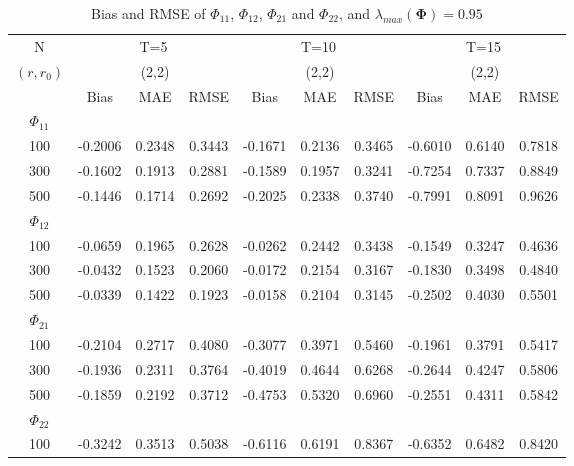 \documentclass[12pt,a4paper,hyperref]{article}
\begin{document}
\begin{table}[H]
\caption{Bias and RMSE of $\Phi_{11}$, $\Phi_{12}$, $\Phi_{21}$ and $\Phi_{22}$, and $\lambda_{max}(\boldsymbol{\Phi})=0.95$}     \label{table1}
\centering
\tabcolsep=0.11cm
\begin{threeparttable}
\begin{tabular} {*{10}{c}}
\toprule
N& \multicolumn{3}{c}{T=5}&\multicolumn{3}{c}{T=10}&\multicolumn{3}{c}{T=15}\\
\cmidrule(lr){1-10}
$(r,r_{0})$ &   &(2,2)  &  &   &(2,2)  & &  &(2,2) & \\
\cmidrule(lr){1-4} \cmidrule(lr){5-7}\cmidrule(lr){8-10}
& \multicolumn{1}{c}{Bias} &\multicolumn{1}{c}{MAE}& \multicolumn{1}{c}{RMSE}&\multicolumn{1}{c}{Bias} &\multicolumn{1}{c}{MAE}& \multicolumn{1}{c}{RMSE}&\multicolumn{1}{c}{Bias}&\multicolumn{1}{c}{MAE} & \multicolumn{1}{c}{RMSE}\\
  \cmidrule(lr){2-4} \cmidrule(lr){5-7} \cmidrule(lr){8-10}
 $\Phi_{11}$\\
\cmidrule(lr){1-10}
 100&-0.2006 & 0.2348& 0.3443&	-0.1671 &	0.2136& 0.3465&-0.6010 &0.6140 & 0.7818 \\
300& -0.1602 &0.1913 &0.2881&	-0.1589 &0.1957	&0.3241	&-0.7254& 0.7337& 0.8849 \\
500& -0.1446&0.1714 & 0.2692&	 -0.2025 &0.2338& 0.3740& -0.7991& 0.8091&	0.9626  \\
\cmidrule(lr){1-10}
$\Phi_{12}$\\
\cmidrule(lr){1-4}   \cmidrule(lr){5-7}   \cmidrule(lr){8-10}
  100&-0.0659  &0.1965 & 0.2628&-0.0262	  &0.2442& 0.3438&-0.1549 &0.3247& 0.4636 \\
300& -0.0432 & 0.1523& 0.2060&	-0.0172 &	0.2154&	0.3167& -0.1830& 0.3498&0.4840  \\
500& -0.0339& 0.1422 &  0.1923 &	-0.0158 &0.2104	& 0.3145& -0.2502&0.4030&	0.5501  \\
\cmidrule(lr){1-10}
$\Phi_{21}$\\
\cmidrule(lr){1-4}   \cmidrule(lr){5-7}   \cmidrule(lr){8-10}
 100& -0.2104 & 0.2717&0.4080 &-0.3077	  &0.3971	&0.5460& -0.1961& 0.3791&0.5417  \\
300&-0.1936  & 0.2311& 0.3764&-0.4019	  &	0.4644&0.6268	&-0.2644& 0.4247& 0.5806 \\
500&-0.1859 & 0.2192& 0.3712 &	 -0.4753 &0.5320	& 0.6960&-0.2551 & 0.4311&	0.5842  \\
\cmidrule(lr){1-10}
$\Phi_{22}$\\
\cmidrule(lr){1-4}   \cmidrule(lr){5-7}   \cmidrule(lr){8-10}
 100&-0.3242 & 0.3513& 0.5038&	-0.6116 &0.6191	&0.8367& -0.6352&0.6482 &  0.8420 \\

\end{tabular}
\end{threeparttable}
\end{table}
\end{document}
